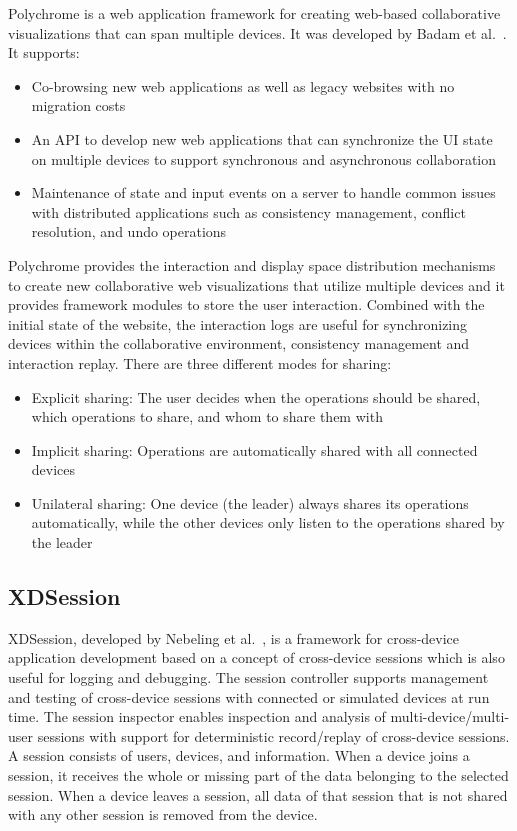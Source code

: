 Polychrome is a web application framework for creating web-based collaborative visualizations that can span multiple devices. It was developed by Badam et al.~\cite{polychrome2014}. It supports:
\begin{itemize}
	\item Co-browsing new web applications as well as legacy websites with no migration costs
	\item An API to develop new web applications that can synchronize the UI state on multiple devices to support synchronous and asynchronous collaboration
	\item Maintenance of state and input events on a server to handle common issues with distributed applications such as consistency management, conflict resolution, and undo operations
\end{itemize}
Polychrome provides the interaction and display space distribution mechanisms to create new collaborative web visualizations that utilize multiple devices and it provides framework modules to store the user interaction. Combined with the initial state of the website, the interaction logs are useful for synchronizing devices within the collaborative environment, consistency management and interaction replay. There are three different modes for sharing:
\begin{itemize}
	\item Explicit sharing: The user decides when the operations should be shared, which operations to share, and whom to share them with
	\item Implicit sharing: Operations are automatically shared with all connected devices
	\item Unilateral sharing: One device (the leader) always shares its operations automatically, while the other devices only listen to the operations shared by the leader
\end{itemize}

\subsection{XDSession}

XDSession, developed by Nebeling et al.~\cite{xdsession2015}, is a framework for cross-device application development based on a concept of cross-device sessions which is also useful for logging and debugging. The session controller supports management and testing of cross-device sessions with connected or simulated devices at run time. The session inspector enables inspection and analysis of multi-device/multi-user sessions with support for deterministic record/replay of cross-device sessions. A session consists of users, devices, and information. When a device joins a session, it receives the whole or missing part of the data belonging to the selected session. When a device leaves a session, all data of that session that is not shared with any other session is removed from the device.

